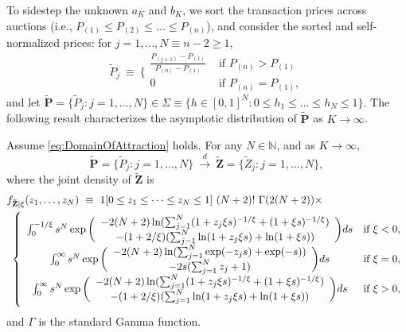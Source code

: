 To sidestep the unknown $a_K$ and $b_K$, we sort the transaction prices across auctions (i.e., $P_{(1)}\leq P_{(2)}\leq \dots \leq P_{(n)}$), and consider the sorted and self-normalized prices: for $j=1,\dots, N \equiv n-2 \geq 1$, 
\begin{equation}
\tilde{P}_{j}~\equiv ~\Bigg\{
\begin{array}{cc}
     \frac{P_{(j+1)}-P_{(1)}}{P_{(n)}-P_{(1)}}&\text{ if }P_{(n)} > P_{(1)}  \\
    0&\text{ if }P_{(n)} = P_{(1)} , 
\end{array}
    \label{eq:P*}
\end{equation}
and let $\mathbf{\tilde{P}}=\{ \tilde{P}_{j}:j=1,\dots,N\} \in \Sigma \equiv \{h \in [0,1]^N : 0\leq h_1 \leq \dots \leq h_N \leq 1\}$. The following result characterizes the asymptotic distribution of $\mathbf{\tilde{P}}$ as $K\to \infty$. 
\begin{lemma}\label{lem:densitySecond}
Assume \eqref{eq:DomainOfAttraction} holds. For any $N\in \mathbb{N}$, and as $K \to \infty$,
\begin{equation}
\mathbf{\tilde{P}}=\{ \tilde{P}_{j}:j=1,\dots,N\} ~\overset{d}{\to }~\mathbf{\tilde{Z}}=\{ \tilde{Z}_{j}:j=1,\dots,N\} ,
\label{eq:P*joint}
\end{equation}
where the joint density of $\mathbf{\tilde{Z}}$ is
\begin{align}
&f_{\mathbf{\tilde{Z}}|\xi}( z_{1},\dots,z_{N} ) ~\equiv~ 1[ 0\leq z_{1}\leq \dots \leq z_{N}\leq 1] ~ (N+2)!~\Gamma ( 2( N+2) ) \times \notag \\
&~\left\{ 
\begin{array}{cc}
\int_{0}^{-1/\xi }s^{N}\exp \bigg(
\begin{array}{c}
-2( N+2) \ln ( \sum_{j=1}^{N}( 1+z_{j}\xi s) ^{-1/\xi }+(1+\xi s)^{-1/\xi }) \\
-( 1+2/\xi ) ( \sum_{j=1}^{N}\ln ( 1+z_{j}\xi s) +\ln (1+\xi s))
\end{array}
\bigg) ds & \text{if }\xi <0, \\
\int_{0}^{\infty }s^{N}\exp \bigg(
\begin{array}{c}
-2( N+2) \ln ( \sum_{j=1}^{N}\exp ( -z_{j}s) +\exp ( -s) ) \\
-2s( \sum_{j=1}^{N}z_{j}+1)
\end{array}
\bigg) ds & \text{if }\xi =0,\\
\int_{0}^{\infty }s^{N}\exp \bigg(
\begin{array}{c}
-2( N+2) \ln ( \sum_{j=1}^{N}( 1+z_{j}\xi s) ^{-1/\xi }+(1+\xi s)^{-1/\xi }) \\
-( 1+2/\xi ) ( \sum_{j=1}^{N}\ln ( 1+z_{j}\xi s) +\ln (1+\xi s))
\end{array}
\bigg) ds & \text{if }\xi >0,
\end{array}
\right. \label{eq:densitySecond}
\end{align}
and $\Gamma $ is the standard Gamma function.
\end{lemma}

